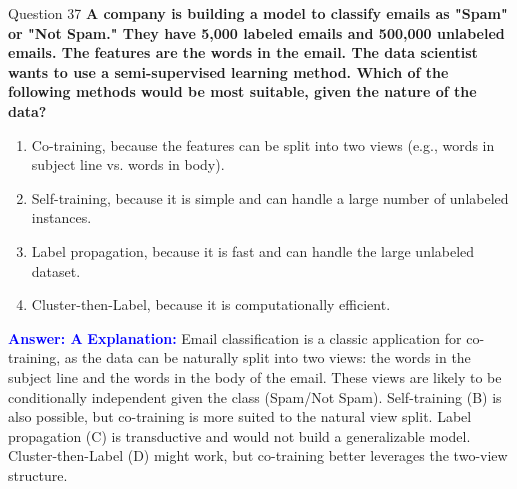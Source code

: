 \documentclass[8pt]{beamer}  %
\begin{document}
	\begin{frame}{Question 37}
		\textbf{A company is building a model to classify emails as "Spam" or "Not Spam." They have 5,000 labeled emails and 500,000 unlabeled emails. The features are the words in the email. The data scientist wants to use a semi-supervised learning method. Which of the following methods would be most suitable, given the nature of the data?}
		\begin{enumerate}
			\item Co-training, because the features can be split into two views (e.g., words in subject line vs. words in body).
			\item Self-training, because it is simple and can handle a large number of unlabeled instances.
			\item Label propagation, because it is fast and can handle the large unlabeled dataset.
			\item Cluster-then-Label, because it is computationally efficient.
		\end{enumerate}
		\vspace{0.2cm}
		\textcolor{blue}{\textbf{Answer: A}}
		\vspace{0.2cm}
		\textcolor{blue}{\textbf{Explanation:}} Email classification is a classic application for co-training, as the data can be naturally split into two views: the words in the subject line and the words in the body of the email. These views are likely to be conditionally independent given the class (Spam/Not Spam). Self-training (B) is also possible, but co-training is more suited to the natural view split. Label propagation (C) is transductive and would not build a generalizable model. Cluster-then-Label (D) might work, but co-training better leverages the two-view structure.
	\end{frame}
	
\end{document}
